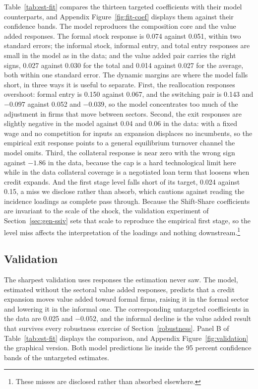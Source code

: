 \documentclass[12pt]{article}
\begin{document}
Table~\ref{tab:est-fit} compares the thirteen targeted coefficients with their model counterparts, and Appendix Figure~\ref{fig:fit-coef} displays them against their confidence bands. The model reproduces the composition core and the value added responses. The formal stock response is 0.074 against 0.051, within two standard errors; the informal stock, informal entry, and total entry responses are small in the model as in the data; and the value added pair carries the right signs, 0.027 against 0.030 for the total and 0.014 against 0.027 for the average, both within one standard error. The dynamic margins are where the model falls short, in three ways it is useful to separate. First, the reallocation responses overshoot: formal entry is 0.150 against 0.067, and the switching pair is 0.143 and $-0.097$ against 0.052 and $-0.039$, so the model concentrates too much of the adjustment in firms that move between sectors. Second, the exit responses are slightly negative in the model against 0.04 and 0.06 in the data: with a fixed wage and no competition for inputs an expansion displaces no incumbents, so the empirical exit response points to a general equilibrium turnover channel the model omits. Third, the collateral response is near zero with the wrong sign against $-1.86$ in the data, because the cap is a hard technological limit here while in the data collateral coverage is a negotiated loan term that loosens when credit expands. And the first stage level falls short of its target, 0.024 against 0.15, a miss we disclose rather than absorb, which cautions against reading the incidence loadings as complete pass through. Because the Shift-Share coefficients are invariant to the scale of the shock, the validation experiment of Section~\ref{sec:gen-ssiv} sets that scale to reproduce the empirical first stage, so the level miss affects the interpretation of the loadings and nothing downstream.\footnote{These misses are disclosed rather than absorbed elsewhere.}

\subsection{Validation}
\label{sec:est-validation}

The sharpest validation uses responses the estimation never saw. The model, estimated without the sectoral value added responses, predicts that a credit expansion moves value added toward formal firms, raising it in the formal sector and lowering it in the informal one. The corresponding untargeted coefficients in the data are 0.025 and $-0.052$, and the informal decline is the value added result that survives every robustness exercise of Section~\ref{robustness}. Panel B of Table~\ref{tab:est-fit} displays the comparison, and Appendix Figure~\ref{fig:validation} the graphical version. Both model predictions lie inside the 95 percent confidence bands of the untargeted estimates.
\end{document}
